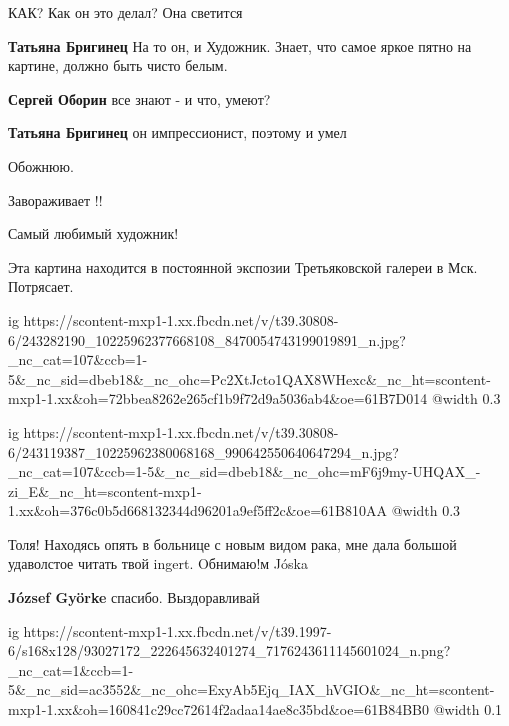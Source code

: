  
 
 
 
 

КАК? Как он это делал? Она светится

\textbf{Татьяна Бригинец} На то он, и Художник. Знает, что самое яркое пятно на картине, должно быть чисто белым.

\textbf{Сергей Оборин} все знают - и что, умеют?

\textbf{Татьяна Бригинец} он импрессионист, поэтому и умел

Обожнюю.

Завораживает !!

Самый любимый художник!

Эта картина находится в постоянной экспозии Третьяковской галереи в Мск. Потрясает.

\ifcmt
  ig https://scontent-mxp1-1.xx.fbcdn.net/v/t39.30808-6/243282190_10225962377668108_8470054743199019891_n.jpg?_nc_cat=107&ccb=1-5&_nc_sid=dbeb18&_nc_ohc=Pc2XtJcto1QAX8WHexc&_nc_ht=scontent-mxp1-1.xx&oh=72bbea8262e265cf1b9f72d9a5036ab4&oe=61B7D014
  @width 0.3
\fi


\ifcmt
  ig https://scontent-mxp1-1.xx.fbcdn.net/v/t39.30808-6/243119387_10225962380068168_990642550640647294_n.jpg?_nc_cat=107&ccb=1-5&_nc_sid=dbeb18&_nc_ohc=mF6j9my-UHQAX_-zi_E&_nc_ht=scontent-mxp1-1.xx&oh=376c0b5d668132344d96201a9ef5ff2c&oe=61B810AA
  @width 0.3
\fi

Толя!
Находясь опять в больнице с новым видом рака, мне дала большой удаволстое читать твой ingert.
Oбнимаю!м Jóska

\textbf{József Györke} спасибо. Выздоравливай


\ifcmt
  ig https://scontent-mxp1-1.xx.fbcdn.net/v/t39.1997-6/s168x128/93027172_222645632401274_7176243611145601024_n.png?_nc_cat=1&ccb=1-5&_nc_sid=ac3552&_nc_ohc=ExyAb5Ejq_IAX_hVGIO&_nc_ht=scontent-mxp1-1.xx&oh=160841c29cc72614f2adaa14ae8c35bd&oe=61B84BB0
  @width 0.1
\fi

